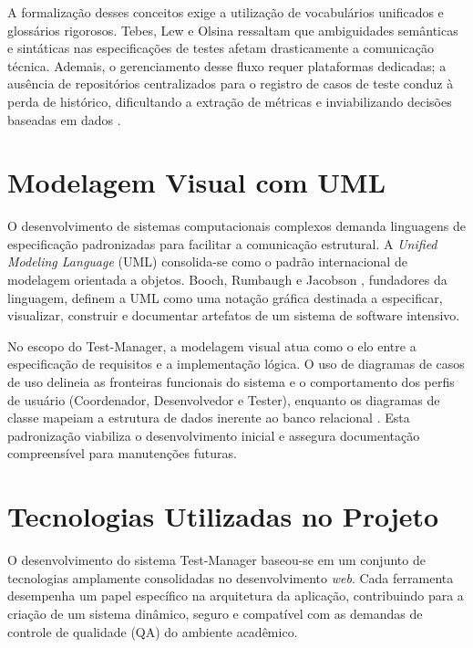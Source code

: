 A formalização desses conceitos exige a utilização de vocabulários unificados e glossários rigorosos. Tebes, Lew e Olsina \cite{tebes2022} ressaltam que ambiguidades semânticas e sintáticas nas especificações de testes afetam drasticamente a comunicação técnica. Ademais, o gerenciamento desse fluxo requer plataformas dedicadas; a ausência de repositórios centralizados para o registro de casos de teste conduz à perda de histórico, dificultando a extração de métricas e inviabilizando decisões baseadas em dados \cite{medeiros2022}.

\section{Modelagem Visual com UML}

O desenvolvimento de sistemas computacionais complexos demanda linguagens de especificação padronizadas para facilitar a comunicação estrutural. A \textit{Unified Modeling Language} (UML) consolida-se como o padrão internacional de modelagem orientada a objetos. Booch, Rumbaugh e Jacobson \cite{booch2005uml}, fundadores da linguagem, definem a UML como uma notação gráfica destinada a especificar, visualizar, construir e documentar artefatos de um sistema de software intensivo.

No escopo do Test-Manager, a modelagem visual atua como o elo entre a especificação de requisitos e a implementação lógica. O uso de diagramas de casos de uso delineia as fronteiras funcionais do sistema e o comportamento dos perfis de usuário (Coordenador, Desenvolvedor e Tester), enquanto os diagramas de classe mapeiam a estrutura de dados inerente ao banco relacional \cite{booch2005uml, wazlawick2019}. Esta padronização viabiliza o desenvolvimento inicial e assegura documentação compreensível para manutenções futuras.

\section{Tecnologias Utilizadas no Projeto}

O desenvolvimento do sistema Test-Manager baseou-se em um conjunto de tecnologias amplamente consolidadas no desenvolvimento \textit{web}. Cada ferramenta desempenha um papel específico na arquitetura da aplicação, contribuindo para a criação de um sistema dinâmico, seguro e compatível com as demandas de controle de qualidade (QA) do ambiente acadêmico.

